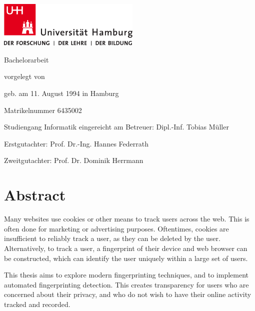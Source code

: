 \documentclass[
    fontsize=12pt,
    headings=small,
    parskip=half,
    bibliography=totoc,
    numbers=noenddot,
    open=any
    ]{scrreprt}
\begin{document}
\newpage
\thispagestyle{empty}
\begin{titlepage}%
\includegraphics[width=6.8cm]{images/up-uhh-logo-u-2010-u-farbe-u-rgb.pdf}
\begin{center}\Large
	\vfill
	Bachelorarbeit
	\vfill
	\makeatletter
	{\Large\textsf{\textbf{\@title}}\par}
	\makeatother
	\vfill
	vorgelegt von
	\par\bigskip
	\makeatletter
	{\@author} \par
	\makeatother
	geb. am 11. August 1994 in Hamburg \par
	Matrikelnummer 6435002 \par
	Studiengang Informatik
	\vfill
	\makeatletter
	eingereicht am {\@date}
	\makeatother
	\vfill
	Betreuer: Dipl.-Inf. Tobias Müller \par
	Erstgutachter: Prof. Dr.-Ing. Hannes Federrath \par
	Zweitgutachter: Prof. Dr. Dominik Herrmann
\end{center}
\end{titlepage}%

\null\newpage

\chapter*{Abstract}

Many websites use cookies or other means to track users across the web. This is often
done for marketing or advertising purposes. Oftentimes, cookies are insufficient to reliably
track a user, as they can be deleted by the user. Alternatively, to track a user, a fingerprint
of their device and web browser can be constructed, which can identify the user uniquely
within a large set of users.

This thesis aims to explore modern fingerprinting techniques, and to implement
automated fingerprinting detection. This creates transparency for users
who are concerned about their privacy, and who do not wish to have their online
activity tracked and recorded.
\end{document}
